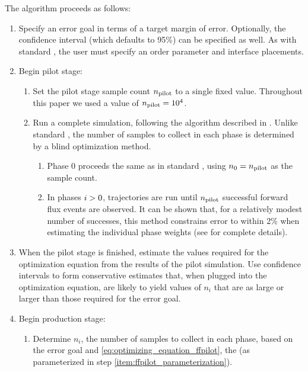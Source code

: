 The  algorithm proceeds as follows:
\begin{enumerate}
    \item Specify an error goal in terms of a target margin of error. Optionally, the confidence interval (which defaults to 95\%) can be specified as well.  As with standard , the user must specify an order parameter and interface placements.
    \item Begin  pilot stage:
        \begin{enumerate}
            \item Set the pilot stage sample count $n_{\textrm{pilot}}$ to a single fixed value. Throughout this paper we used a value of $n_{\textrm{pilot}} = 10^4$.
            \item Run a complete  simulation, following the algorithm described in . Unlike standard , the number of samples to collect in each phase is determined by a blind optimization method.
            \begin{enumerate}
                \item Phase 0 proceeds the same as in standard , using $n_{0} = n_{\textrm{pilot}}$ as the sample count.
                \item In phases $i>0$, trajectories are run until $n_{\textrm{pilot}}$ successful forward flux events are observed. It can be shown that, for a relatively modest number of successes, this method constrains error to within 2\% when estimating the individual phase weights (see  for complete details).
            \end{enumerate}
        \end{enumerate}
    \item \label{item:ffpilot_parameterization} When the pilot stage is finished, estimate the values required for the optimization equation from the results of the pilot simulation. Use confidence intervals to form conservative estimates that, when plugged into the optimization equation, are likely to yield values of $n_i$ that are as large or larger than those required for the error goal.
    \item Begin  production stage:
        \begin{enumerate}
            \item \label{item:ni_calculation} Determine $n_i$, the number of samples to collect in each phase, based on the error goal and \eqref{eq:optimizing_equation_ffpilot}, the \opteq{} (as parameterized in step \ref{item:ffpilot_parameterization}).

\end{enumerate}
\end{enumerate}
